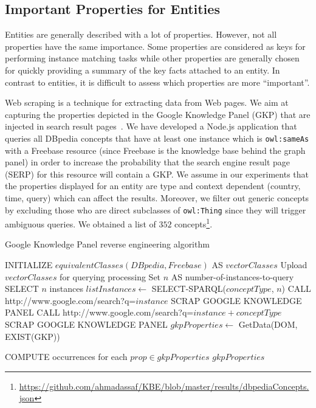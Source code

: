 \documentclass[a4paper,11pt,twoside]{ThesisStyle}
\begin{document}
\subsection{Important Properties for Entities}\label{Section:EKG}

Entities are generally described with a lot of properties. However, not all properties have the same importance. Some properties are considered as keys for performing instance matching tasks while other properties are generally chosen for quickly providing a summary of the key facts attached to an entity. In contrast to entities, it is difficult to assess which properties are more ``important''.

Web scraping is a technique for extracting data from Web pages. We aim at capturing the properties depicted in the Google Knowledge Panel (GKP) that are injected in search result pages~\cite{Bergman:GKG:12}. We have developed a Node.js application that queries all DBpedia concepts that have at least one instance which is \texttt{owl:sameAs} with a Freebase resource (since Freebase is the knowledge base behind the graph panel) in order to increase the probability that the search engine result page (SERP) for this resource will contain a GKP. We assume in our experiments that the properties displayed for an entity are type and context dependent (country, time, query) which can affect the results. Moreover, we filter out generic concepts by excluding those who are direct subclasses of \texttt{owl:Thing} since they will trigger ambiguous queries. We obtained a list of $352$ concepts\footnote{\url{https://github.com/ahmadassaf/KBE/blob/master/results/dbpediaConcepts.json}}.

\begin{algorithm}[ht]
\caption{Google Knowledge Panel reverse engineering algorithm} \label{algoscrapping}
\begin{algorithmic}[1]
\small
    \STATE INITIALIZE $equivalentClasses(DBpedia,Freebase) $ AS $vectorClasses$
    \STATE Upload $vectorClasses$ for querying processing
    \STATE Set $n$ AS number-of-instances-to-query
	\STATE SELECT $n$ instances
	\STATE $listInstances \leftarrow$ SELECT-SPARQL($conceptType$, $n$)
			\STATE CALL http://www.google.com/search?q=$instance$
				\STATE SCRAP GOOGLE KNOWLEDGE PANEL
			\ELSE
				\STATE CALL http://www.google.com/search?q=$instance + conceptType$
 				\STATE SCRAP GOOGLE KNOWLEDGE PANEL
			\ENDIF
			\STATE $gkpProperties \leftarrow$ GetData(DOM, EXIST(GKP))

		\ENDFOR
	\STATE COMPUTE occurrences for each $prop \in gkpProperties$
    \ENDFOR
    \STATE $gkpProperties$
\end{algorithmic}
\end{algorithm}
\end{document}
